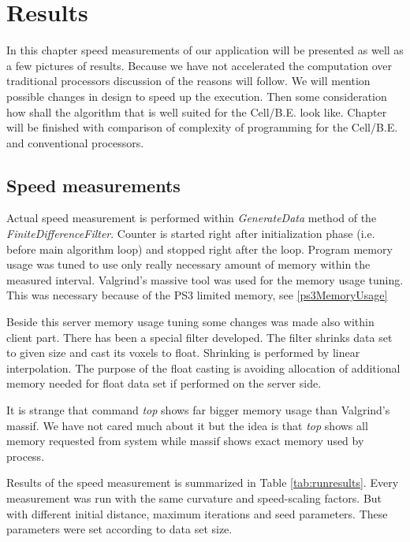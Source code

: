 \chapter{Results}

In this chapter speed measurements of our application will be presented as well as a few pictures of results.
Because we have not accelerated the computation over traditional processors discussion of the reasons will follow.
We will mention possible changes in design to speed up the execution.
Then some consideration how shall the algorithm that is well suited for the \mbox{Cell/B.E.} look like.
Chapter will be finished with comparison of complexity of programming for the \mbox{Cell/B.E.} and conventional processors.

\section{Speed measurements}

\par
Actual speed measurement is performed within \mbox{\emph{GenerateData}} method of the \mbox{\emph{FiniteDifferenceFilter}}.
Counter is started right after initialization phase (i.e. before main algorithm loop) and stopped right after the loop.
Program memory usage was tuned to use only really necessary amount of memory within the measured interval.
Valgrind's massive tool was used for the memory usage tuning.
This was necessary because of the PS3 limited memory, see \ref{ps3MemoryUsage}

\par
Beside this server memory usage tuning some changes was made also within client part.
There has been a special filter developed.
The filter shrinks data set to given size and cast its voxels to float.
Shrinking is performed by linear interpolation.
The purpose of the float casting is avoiding allocation of additional memory needed for float data set if performed on the server side.

\par
It is strange that command \emph{top} shows far bigger memory usage than Valgrind's massif.
We have not cared much about it but the idea is that \emph{top} shows all memory requested from system while massif shows exact memory used by process.\\

\par
Results of the speed measurement is summarized in Table \ref{tab:runresults}.
Every measurement was run with the same curvature and speed-scaling factors.
But with different initial distance, maximum iterations and seed parameters.
These parameters were set according to data set size.

